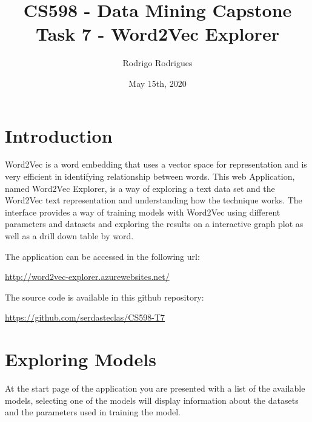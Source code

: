 \documentclass[table,xcdraw]{article}
\begin{document}
\title{CS598 - Data Mining Capstone\\
		\large Task 7 - Word2Vec Explorer}

\author{Rodrigo Rodrigues}
\date{May 15th, 2020}
\maketitle



\section{Introduction}

Word2Vec is a word embedding that uses a vector space for representation and is very efficient in identifying relationship between words.
This web Application, named Word2Vec Explorer, is a way of exploring a text data set and the Word2Vec text representation and understanding how the technique works. The interface provides a way of training models with Word2Vec using different parameters and datasets and exploring the results on a interactive graph plot as well as a drill down table by word.


The application can be accessed in the following url:

\href{http://word2vec-explorer.azurewebsites.net/}{http://word2vec-explorer.azurewebsites.net/}

The source code is available in this github repository:

\href{https://github.com/serdasteclas/CS598-T7}{https://github.com/serdasteclas/CS598-T7}

\section{Exploring Models}

At the start page of the application you are presented with a list of the available models, selecting one of the models will display information about the datasets and the parameters used in training the model.
\end{document}
